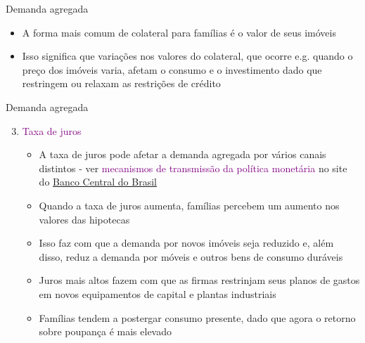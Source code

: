 \documentclass[10pt]{beamer}
\begin{document}
\begin{frame}{Demanda agregada}
    \begin{itemize}
        \item A forma mais comum de colateral para famílias é o valor de seus imóveis\bigskip
         
        \item Isso significa que variações nos valores do colateral, que ocorre e.g. quando o preço dos imóveis varia, afetam o consumo e o investimento dado que restringem ou relaxam  as restrições de crédito
    \end{itemize}
\end{frame}

\begin{frame}{Demanda agregada}
    \begin{enumerate}        
    \setcounter{enumi}{2}
        \item \textcolor{purple}{Taxa de juros}\bigskip
         
        \begin{itemize}
            \item A taxa de juros pode afetar a demanda agregada por vários canais distintos - ver \textcolor{purple}{mecanismos de transmissão da política monetária} no site do \href{https://www.bcb.gov.br/controleinflacao/transmissaopoliticamonetaria}{Banco Central do Brasil}\medskip
             
            \item Quando a taxa de juros aumenta, famílias percebem um aumento nos valores das hipotecas\medskip
             
            \item Isso faz com que a demanda por novos imóveis seja reduzido e, além disso, reduz a demanda por móveis e outros bens de consumo duráveis\medskip
             
            \item Juros mais altos fazem com que as firmas restrinjam seus planos de gastos em novos equipamentos de capital e plantas industriais\medskip
             
            \item Famílias tendem a postergar consumo presente, dado que agora o retorno sobre poupança é mais elevado
        \end{itemize}
    \end{enumerate}
\end{frame}
\end{document}
